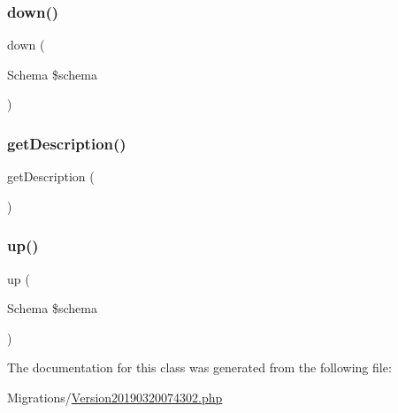 \subsubsection{\texorpdfstring{down()}{down()}}
{\footnotesize\ttfamily down (\begin{DoxyParamCaption}\item[{Schema}]{\$schema }\end{DoxyParamCaption})}

\mbox{\label{class_doctrine_migrations_1_1_version20190320074302_a2e7bb35c71bf1824456ceb944cb7a845}} 
\subsubsection{\texorpdfstring{getDescription()}{getDescription()}}
{\footnotesize\ttfamily get\+Description (\begin{DoxyParamCaption}{ }\end{DoxyParamCaption})}

\mbox{\label{class_doctrine_migrations_1_1_version20190320074302_a23eb1c1428e8ea2ab2cf798fc06ec421}} 
\subsubsection{\texorpdfstring{up()}{up()}}
{\footnotesize\ttfamily up (\begin{DoxyParamCaption}\item[{Schema}]{\$schema }\end{DoxyParamCaption})}



The documentation for this class was generated from the following file\+:\begin{DoxyCompactItemize}
\item 
Migrations/\mbox{\hyperlink{_version20190320074302_8php}{Version20190320074302.\+php}}\end{DoxyCompactItemize}
